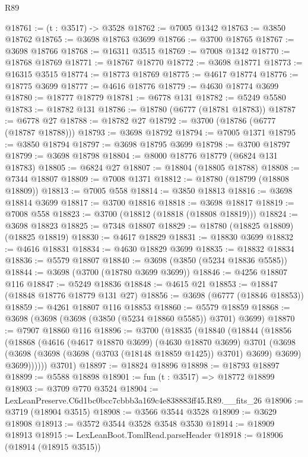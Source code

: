 \begin{lexlean}{R89}
\begin{coremodule}
@18761 := (t : @3517) -> @3528
@18762 := @7005 @1342
@18763 := @3850 @18762
@18765 := @3698 @18763 @3699
@18766 := @3700 @18765
@18767 := @3698 @18766
@18768 := @16311 @3515
@18769 := @7008 @1342
@18770 := @18768 @18769
@18771 := @18767 @18770
@18772 := @3698 @18771
@18773 := @16315 @3515
@18774 := @18773 @18769
@18775 := @4617 @18774
@18776 := @18775 @3699
@18777 := @4616 @18776
@18779 := @4630 @18774 @3699
@18780 := @18777 @18779
@18781 := @6778 @131
@18782 := @5249 @5580
@18783 := @18782 @131
@18786 := @18780 (@6777 (@18781 @18783))
@18787 := @6778 @27
@18788 := @18782 @27
@18792 := @3700 (@18786 (@6777 (@18787 @18788)))
@18793 := @3698 @18792
@18794 := @7005 @1371
@18795 := @3850 @18794
@18797 := @3698 @18795 @3699
@18798 := @3700 @18797
@18799 := @3698 @18798
@18804 := @8000 @18776 @18779 (@6824 @131 @18783)
@18805 := @6824 @27
@18807 := @18804 (@18805 @18788)
@18808 := @7344 @18807
@18809 := @7008 @1371
@18812 := @18780 (@18799 (@18808 @18809))
@18813 := @7005 @558
@18814 := @3850 @18813
@18816 := @3698 @18814 @3699
@18817 := @3700 @18816
@18818 := @3698 @18817
@18819 := @7008 @558
@18823 := @3700 (@18812 (@18818 (@18808 @18819)))
@18824 := @3698 @18823
@18825 := @7348 @18807
@18829 := @18780 (@18825 @18809) (@18825 @18819)
@18830 := @4617 @18829
@18831 := @18830 @3699
@18832 := @4616 @18831
@18834 := @4630 @18829 @3699
@18835 := @18832 @18834
@18836 := @5579 @18807
@18840 := @3698 (@3850 (@5234 @18836 @5585))
@18844 := @3698 (@3700 (@18780 @3699 @3699))
@18846 := @4256 @18807 @116
@18847 := @5249 @18836
@18848 := @4615 @21
@18853 := @18847 (@18848 @18776 @18779 @131 @27)
@18856 := @3698 (@6777 (@18846 @18853))
@18859 := @4261 @18807 @116 @18853
@18860 := @5579 @18859
@18868 := @3698 (@3698 (@3698 (@3850 (@5234 @18860 @5585)) @3701) @3699)
@18870 := @7907 @18860 @116
@18896 := @3700
    (@18835
      (@18840
        (@18844
          (@18856
            (@18868
              (@4616
                (@4617 @18870 @3699)
                (@4630 @18870 @3699)
                @3701
                (@3698
                  (@3698 (@3698 (@3698 (@3703 (@18148 @18859 @1425)) @3701) @3699) @3699)
                  @3699))))))
      @3701)
@18897 := @18824 @18896
@18898 := @18793 @18897
@18899 := @5588 @18898
@18901 := fun (t : @3517) => @18772 @18899
@18903 := @3709 @770 @3524
@18904 := LexLeanPreserve.C6d1bc0bcc7cbbb3a169c4e838883ff45.R89.__fits_26
@18906 := @3719 (@18904 @3515)
@18908 := @3566 @3544 @3528
@18909 := @3629 @18908
@18913 := @3572 @3544 @3528 @3548 @3530
@18914 := @18909 @18913
@18915 := LexLeanBoot.TomlRead.parseHeader
@18918 := @18906 (@18914 (@18915 @3515))

\end{coremodule}
\end{lexlean}
